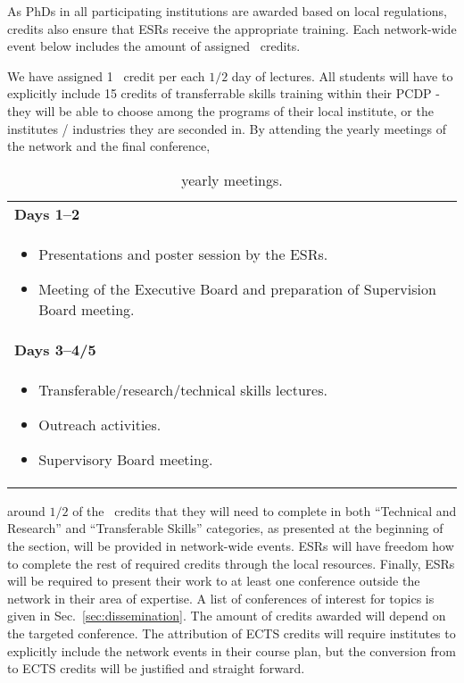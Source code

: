 As PhDs in all participating institutions are awarded based on local regulations, \acronym credits also ensure that ESRs receive the appropriate training. 
Each network-wide event below includes the amount of assigned \acronym\ credits.

We have assigned 1 \acronym\ credit per each $1/2$ day of lectures. 
All students will have to explicitly include 15 credits of transferrable skills training within their PCDP - they will be able to choose among the programs of their local institute, or the institutes / industries they are seconded in. 
By attending the yearly meetings of the network and the final conference,
\begin{wraptable}{l}{0.45\textwidth}
	\caption{\acronym yearly meetings.\label{tab:YearlyMeeting}}
    \vspace{4mm}
	\small
	\begin{tabular}{m{75mm}}
		\midrule 
		\textbf{Days 1--2}\tabularnewline 
		{\begin{itemize}%
				\item Presentations and poster session by the ESRs.
				\item Meeting of the Executive Board and \linebreak
				preparation of Supervision Board meeting.
                \vspace{-5mm}
			\end{itemize}}
            \tabularnewline
            \midrule 
			\textbf{Days 3--4/5}\tabularnewline 
			\begin{itemize}%
				\item Transferable/research/technical skills lectures.
				\item Outreach activities. 
				\item Supervisory Board meeting. \vspace{-4mm}
			\end{itemize} \tabularnewline \midrule
		\end{tabular}
		\vspace{-3mm}
	\end{wraptable}
around $1/2$ of the \acronym\ credits that they will need to complete in both ``Technical and Research'' and ``Transferable Skills'' categories, as presented at the beginning of the section, will be provided in network-wide events. 
ESRs will have freedom how to complete the rest of required credits through the local resources. 
Finally, ESRs will be required to present their work to at least one conference outside the network in their area of expertise. 
A list of conferences of interest for \acronym topics is given in Sec.~\ref{sec:dissemination}.
The amount of credits awarded will depend on the targeted conference.  
The attribution of ECTS credits will require institutes to explicitly include the network events in their course plan, but the conversion from \acronym to ECTS credits will be justified and straight forward. 

